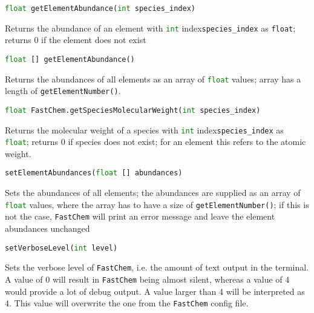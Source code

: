 \documentclass[numbers=noenddot]{aux/fcmanual}
\newcommand{\fc}{\texttt{FastChem}\xspace}
\begin{document}
\bigbreak

\lstinline[language=Python]!float getElementAbundance(int species_index)!
\begin{addmargin}[25pt]{0pt}
	Returns the abundance of an element with \lstinline[language=Python]!int! index\footnotemark[\value{footnote}] \lstinline!species_index! as \lstinline!float!; returns 0 if the element does not exist
\end{addmargin}


\bigbreak

\lstinline[language=Python]!float [] getElementAbundance()!
\begin{addmargin}[25pt]{0pt}
	Returns the abundances of all elements as an array of \lstinline[language=Python]!float! values; array has a length of \lstinline!getElementNumber()!.
\end{addmargin}


\bigbreak

\lstinline[language=Python]!float FastChem.getSpeciesMolecularWeight(int species_index)!
\begin{addmargin}[25pt]{0pt}
	Returns the molecular weight of a species with \lstinline[language=Python]!int! index\footnotemark[\value{footnote}] \lstinline!species_index! as \lstinline[language=Python]!float!; returns 0 if species does not exist; for an element this refers to the atomic weight.
\end{addmargin}


\bigbreak

\lstinline[language=Python]!setElementAbundances(float [] abundances)!
\begin{addmargin}[25pt]{0pt}
	Sets the abundances of all elements; the abundances are supplied as an array of \lstinline[language=Python]!float! values, where the array has to have a size of \lstinline[language=Python]!getElementNumber()!; if this is not the case, \fc will print an error message and leave the element abundances unchanged
\end{addmargin}

\bigbreak

\lstinline[language=Python]!setVerboseLevel(int level)!
\begin{addmargin}[25pt]{0pt}
	Sets the verbose level of \fc, i.e. the amount of text output in the terminal. A value of 0 will result in \fc being almost silent, whereas a value of 4 would provide a lot of debug output. A value larger than 4 will be interpreted as 4. This value will overwrite the one from the \fc config file.
\end{addmargin}
\end{document}
